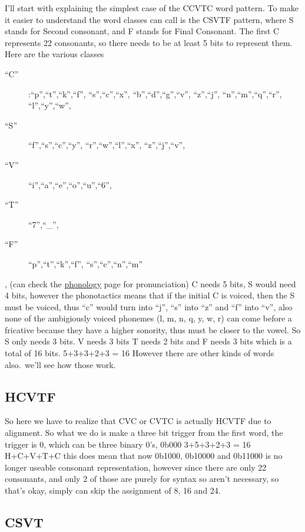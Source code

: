 \documentclass[12pt]{report}
\begin{document}
I'll start with explaining the simplest case of the CCVTC word pattern.
To make it easier to understand the word classes can call is the CSVTF
pattern, where S stands for Second consonant, and F stands for Final
Consonant. The first C represents 22 consonants, so there needs to be at
least 5 bits to represent them. Here are the various classes
\begin{description}
\item[``C'']:``p'',``t'',``k'',``f'', ``s'',``c'',``x'',
``b'',``d'',``g'',``v'', ``z'',``j'', ``n'',``m'',``q'',``r'',
``l'',``y'',``w'', 
\item[``S'']``f'',``s'',``c'',``y'', ``r'',``w'',``l'',``x'', ``z'',``j'',``v'',
\item[``V'']``i'',``a'',``e'',``o'',``u'',``6'',
\item[``T'']``7'',``\_'', 
\item[``F'']``p'',``t'',``k'',``f'',
``s'',``c'',``n'',``m''
\end{description}
, (can check the
\href{http://wyn.bot.nu/spel/src/vocab/gen/phonology.html}{phonology}
page for pronunciation) C needs 5 bits, S would need 4 bits, however the
phonotactics means that if the initial C is voiced, then the S must be
voiced, thus ``c'' would turn into ``j'', ``s'' into ``z'' and ``f''
into ``v'', also none of the ambigiously voiced phonemes (l, m, n, q, y,
w, r) can come before a fricative because they have a higher sonority,
thus must be closer to the vowel. So S only needs 3 bits. V needs 3 bits
T needs 2 bits and F needs 3 bits which is a total of 16 bits. 5+3+3+2+3
= 16 However there are other kinds of words also.\ we'll see how those
work.

\subsection{HCVTF}\label{hcvtf}

So here we have to realize that CVC or CVTC is actually HCVTF due to
alignment. So what we do is make a three bit trigger from the first
word, the trigger is 0, which can be three binary 0's, 0b000 3+5+3+2+3 =
16 H+C+V+T+C this does mean that now 0b1000, 0b10000 and 0b11000 is no
longer useable consonant representation, however since there are only 22
consonants, and only 2 of those are purely for syntax so aren't
necessary, so that's okay, simply can skip the assignment of 8, 16 and
24.

\subsection{CSVT}\label{csvt}
\end{document}
